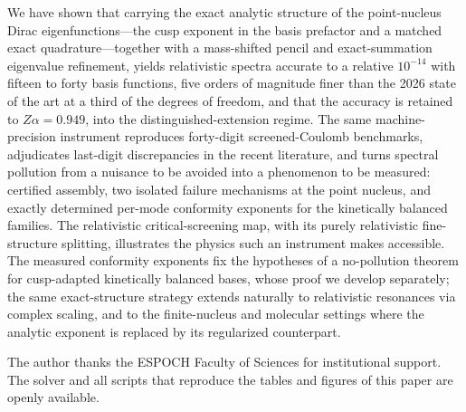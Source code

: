 \documentclass[aps,pra,twocolumn,superscriptaddress,showpacs,floatfix,longbibliography]{revtex4-2}
\newcommand{\Za}{\ensuremath{Z\alpha}}
\begin{document}
We have shown that carrying the exact analytic structure of the
point-nucleus Dirac eigenfunctions---the cusp exponent in the basis
prefactor and a matched exact quadrature---together with a mass-shifted
pencil and exact-summation eigenvalue refinement, yields relativistic
spectra accurate to a relative $10^{-14}$ with fifteen to forty basis
functions, five orders of magnitude finer than the 2026 state of the art
at a third of the degrees of freedom, and that the accuracy is retained to
$\Za=0.949$, into the distinguished-extension regime. The same
machine-precision instrument reproduces forty-digit screened-Coulomb
benchmarks, adjudicates last-digit discrepancies in the recent literature,
and turns spectral pollution from a nuisance to be avoided into a
phenomenon to be measured: certified assembly, two isolated failure
mechanisms at the point nucleus, and exactly determined per-mode
conformity exponents for the kinetically balanced families. The
relativistic critical-screening map, with its purely relativistic
fine-structure splitting, illustrates the physics such an instrument makes
accessible. The measured conformity exponents fix the hypotheses of a
no-pollution theorem for cusp-adapted kinetically balanced bases, whose
proof we develop separately; the same exact-structure strategy extends
naturally to relativistic resonances via complex scaling, and to the
finite-nucleus and molecular settings where the analytic exponent is
replaced by its regularized counterpart.

\begin{acknowledgments}
The author thanks the ESPOCH Faculty of Sciences for institutional
support. The solver and all scripts that reproduce the tables and figures
of this paper are openly available.
\end{acknowledgments}


\end{document}
